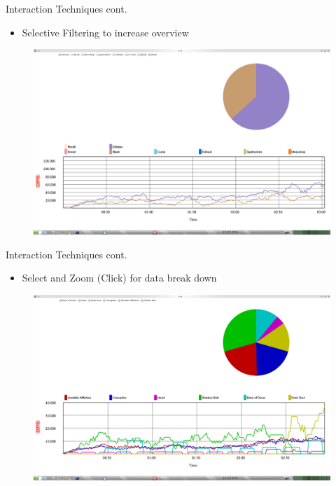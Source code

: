 \documentclass{beamer}
\begin{document}
\begin{frame}{Interaction Techniques cont.}
\begin{itemize}
	\item Selective Filtering to increase overview
\end{itemize}
	\begin{figure}
		\includegraphics[width=\textwidth]{filter.png}
	\end{figure}
\end{frame}

\begin{frame}{Interaction Techniques cont.}
\begin{itemize}
	\item Select and Zoom (Click) for data break down
\end{itemize}
	\begin{figure}
		\includegraphics[width=\textwidth]{detail.png}
	\end{figure}
\end{frame}
\end{document}

